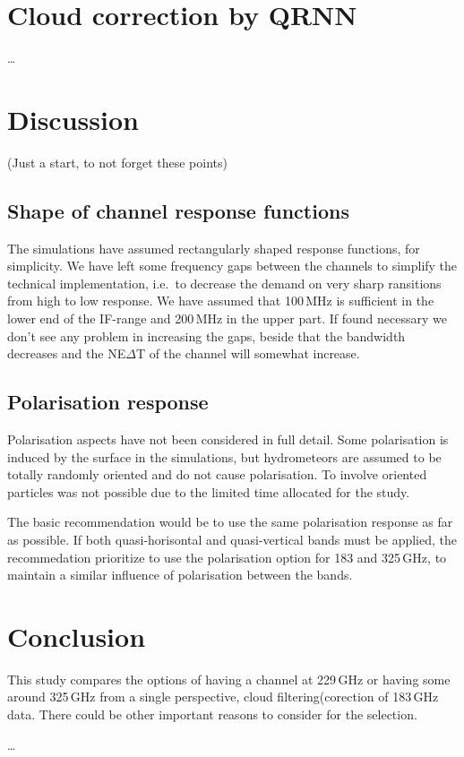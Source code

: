 \documentclass[12pt]{article}
\begin{document}
\section{Cloud correction by QRNN}
%
\dots


\section{Discussion}

(Just a start, to not forget these points)

\subsection{Shape of channel response functions}
%
The simulations have assumed rectangularly shaped response functions, for
simplicity. We have left some frequency gaps between the channels to simplify
the technical implementation, i.e.\ to decrease the demand on very sharp
ransitions from high to low response. We have assumed that 100\,MHz is
sufficient in the lower end of the IF-range and 200\,MHz in the upper part. If
found necessary we don't see any problem in increasing the gaps, beside that
the bandwidth decreases and the NE$\Delta$T of the channel will somewhat
increase.



\subsection{Polarisation response}
%
Polarisation aspects have not been considered in full detail. Some polarisation
is induced by the surface in the simulations, but hydrometeors are assumed to
be totally randomly oriented and do not cause polarisation. To involve oriented
particles was not possible due to the limited time allocated for the study.

The basic recommendation would be to use the same polarisation response as far
as possible. If both quasi-horisontal and quasi-vertical bands must be applied,
the recommedation prioritize to use the polarisation option for 183 and
325\,GHz, to maintain a similar influence of polarisation between the bands.




\section{Conclusion}
%
This study compares the options of having a channel at 229\,GHz or having some
around 325\,GHz from a single perspective, cloud filtering(corection of
183\,GHz data. There could be other important reasons to consider for the
selection.

\dots


{\footnotesize

}
\end{document}
